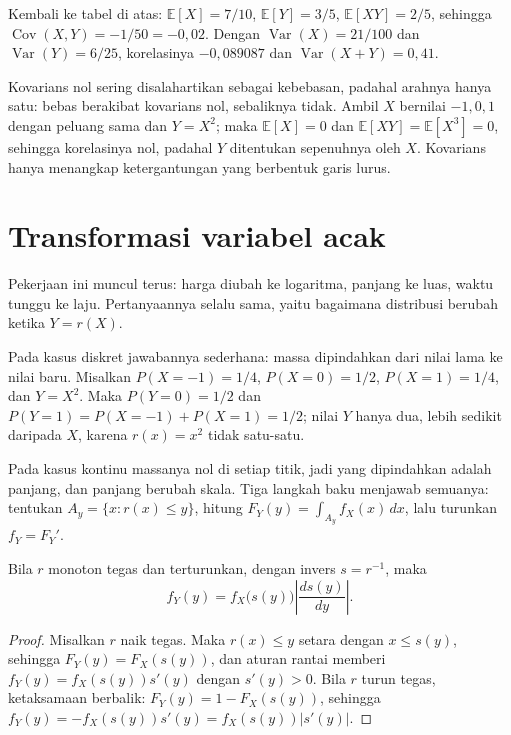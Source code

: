 Kembali ke tabel di atas: $\mathbb{E}[X]=7/10$, $\mathbb{E}[Y]=3/5$,
$\mathbb{E}[XY]=2/5$, sehingga $\operatorname{Cov}(X,Y)=-1/50=-0{,}02$. Dengan
$\operatorname{Var}(X)=21/100$ dan $\operatorname{Var}(Y)=6/25$, korelasinya
$-0{,}089087$ dan $\operatorname{Var}(X+Y)=0{,}41$.

Kovarians nol sering disalahartikan sebagai kebebasan, padahal arahnya hanya satu:
bebas berakibat kovarians nol, sebaliknya tidak. Ambil $X$ bernilai $-1,0,1$ dengan
peluang sama dan $Y=X^2$; maka $\mathbb{E}[X]=0$ dan
$\mathbb{E}[XY]=\mathbb{E}[X^3]=0$, sehingga korelasinya nol, padahal $Y$ ditentukan
sepenuhnya oleh $X$. Kovarians hanya menangkap ketergantungan yang berbentuk garis
lurus.


\section{Transformasi variabel acak}

Pekerjaan ini muncul terus: harga diubah ke logaritma, panjang ke luas, waktu tunggu
ke laju. Pertanyaannya selalu sama, yaitu bagaimana distribusi berubah ketika
$Y=r(X)$.

Pada kasus diskret jawabannya sederhana: massa dipindahkan dari nilai lama ke nilai
baru. Misalkan $P(X=-1)=1/4$, $P(X=0)=1/2$, $P(X=1)=1/4$, dan $Y=X^2$. Maka
$P(Y=0)=1/2$ dan $P(Y=1)=P(X=-1)+P(X=1)=1/2$; nilai $Y$ hanya dua, lebih sedikit
daripada $X$, karena $r(x)=x^2$ tidak satu-satu.

Pada kasus kontinu massanya nol di setiap titik, jadi yang dipindahkan adalah panjang,
dan panjang berubah skala. Tiga langkah baku menjawab semuanya: tentukan
$A_y=\{x:r(x)\le y\}$, hitung $F_Y(y)=\int_{A_y}f_X(x)\,dx$, lalu turunkan
$f_Y=F_Y'$.

\begin{teorema}
Bila $r$ monoton tegas dan terturunkan, dengan invers $s=r^{-1}$, maka
\[
f_Y(y)=f_X\bigl(s(y)\bigr)\left|\frac{ds(y)}{dy}\right| .
\]
\end{teorema}

\begin{proof}
Misalkan $r$ naik tegas. Maka $r(x)\le y$ setara dengan $x\le s(y)$, sehingga
$F_Y(y)=F_X(s(y))$, dan aturan rantai memberi $f_Y(y)=f_X(s(y))s'(y)$ dengan
$s'(y)>0$. Bila $r$ turun tegas, ketaksamaan berbalik: $F_Y(y)=1-F_X(s(y))$, sehingga
$f_Y(y)=-f_X(s(y))s'(y)=f_X(s(y))|s'(y)|$.
\end{proof}

